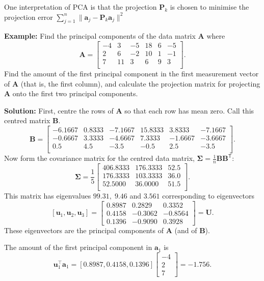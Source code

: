 One interpretation of PCA is that the projection $\mathbf{P}_k$ is chosen to minimise the projection error
$\sum_{j=1}^n\|\mathbf{a}_j-\mathbf{P}_k\mathbf{a}_j\|^2$


{\bf Example:} Find the principal components of the data matrix $\mathbf A$ where 
\[ \mathbf A= \left[ 
\begin{array}{rrrrrr}
  -4   & 3  & -5  & 18 &   6  & -5 \\
    2  &  6  & -2  & 10   & 1 &  -1 \\ 
    7 &  11  &  3 &   6  &  9 &   3 \\
\end{array} \right].
\]
Find the amount of the first principal component in the first measurement vector of $\mathbf A$ (that is, the first column), and calculate the projection matrix for projecting  $\mathbf A$ onto the first two principal components.


{\bf Solution:} First, centre the rows of $\mathbf A$ so that each row has mean zero.  Call this centred matrix $\mathbf B$.
\[ \mathbf B= \left[ 
\begin{array}{rrrrrr}
 -6.1667 & 0.8333 & -7.1667 & 15.8333  & 3.8333 & -7.1667 \\
 -0.6667 & 3.3333 & -4.6667 & 7.3333 & -1.6667 & -3.6667\\
  0.5 & 4.5 & -3.5 & -0.5 & 2.5 & -3.5\\
\end{array} \right].
\]
Now form the covariance matrix for the centred data matrix,  $\mathbf{\Sigma}  = \frac 1 n \mathbf B \mathbf B^{\mathsf T}$:
\[ \mathbf \Sigma = \frac 1 5 \left[ 
\begin{array}{rrr}
 406.8333 &176.3333   &  52.5\\
 176.3333 & 103.3333 &  36.0\\
  52.5000  & 36.0000 & 51.5\\
\end{array} \right].
\]
This matrix has eigenvalues $99.31, \;  9.46$ and  $ 3.561$ corresponding to eigenvectors 
\[ [\mathbf u_1, \mathbf u_2, \mathbf u_3] =  \left[ 
\begin{array}{rrr}
 0.8987 & 0.2829 & 0.3352 \\ 
 0.4158 & -0.3062 & -0.8564 \\ 
 0.1396 & -0.9090 & 0.3928  
 \end{array} \right] = \mathbf U.
\]
These eigenvectors are the principal components of $\mathbf A$ (and of $\mathbf B$).  

The amount  of the first principal component in $\mathbf a_1$ is $$\mathbf u_1^\top \mathbf a_1 =   
[0.8987, 0.4158, 0.1396] \left[\begin{array}{r}
-4 \\ 2\\ 7 \end{array} \right] = -1.756.
$$

